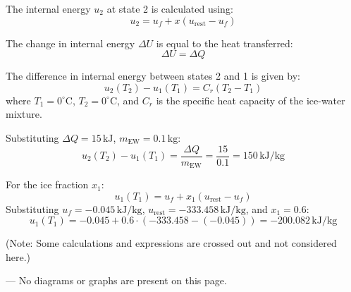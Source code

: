 The internal energy \( u_2 \) at state 2 is calculated using:  
\[
u_2 = u_f + x (u_{\text{rest}} - u_f)
\]  

The change in internal energy \( \Delta U \) is equal to the heat transferred:  
\[
\Delta U = \Delta Q
\]  

The difference in internal energy between states 2 and 1 is given by:  
\[
u_2(T_2) - u_1(T_1) = C_r (T_2 - T_1)
\]  
where \( T_1 = 0^\circ\text{C} \), \( T_2 = 0^\circ\text{C} \), and \( C_r \) is the specific heat capacity of the ice-water mixture.  

Substituting \( \Delta Q = 15 \, \text{kJ} \), \( m_{\text{EW}} = 0.1 \, \text{kg} \):  
\[
u_2(T_2) - u_1(T_1) = \frac{\Delta Q}{m_{\text{EW}}} = \frac{15}{0.1} = 150 \, \text{kJ/kg}
\]  

For the ice fraction \( x_1 \):  
\[
u_1(T_1) = u_f + x_1 (u_{\text{rest}} - u_f)
\]  
Substituting \( u_f = -0.045 \, \text{kJ/kg} \), \( u_{\text{rest}} = -333.458 \, \text{kJ/kg} \), and \( x_1 = 0.6 \):  
\[
u_1(T_1) = -0.045 + 0.6 \cdot (-333.458 - (-0.045)) = -200.082 \, \text{kJ/kg}
\]  

(Note: Some calculations and expressions are crossed out and not considered here.)  

---  
No diagrams or graphs are present on this page.